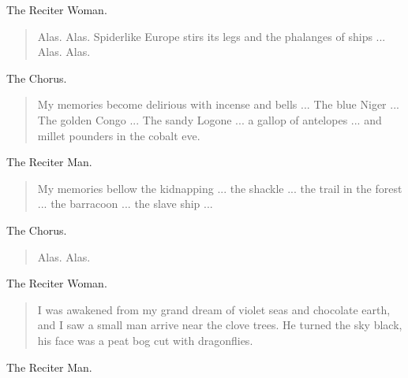 \documentclass[letterpaper,article,12pt,oneside,notitlepage]{memoir}
\begin{document}
\begin{center}The Reciter Woman.\end{center}

\begin{verse}
\indent Alas. Alas. Spiderlike Europe stirs its legs and the phalanges of ships ... Alas. Alas. \\
\end{verse}

\begin{center}The Chorus.\end{center}

\begin{verse}
\indent My memories become delirious with incense and bells ... The blue Niger ... The golden Congo ... The sandy Logone ... a gallop of antelopes ... and millet pounders in the cobalt eve. \\
\end{verse}

\begin{center}The Reciter Man.\end{center}

\begin{verse}
\indent My memories bellow the kidnapping ... the shackle ... the trail in the forest ... the barracoon ... the slave ship ... \\
\end{verse}

\begin{center}The Chorus.\end{center}

\begin{verse}
\hspace{1cm} Alas. Alas. \\
\end{verse}

\begin{center}The Reciter Woman.\end{center}

\begin{verse}
\indent I was awakened from my grand dream of violet seas and chocolate earth, and I saw a small man arrive near the clove trees. He turned the sky black, his face was a peat bog cut with dragonflies. \\
\end{verse}

\begin{center}The Reciter Man.\end{center}
\end{document}
